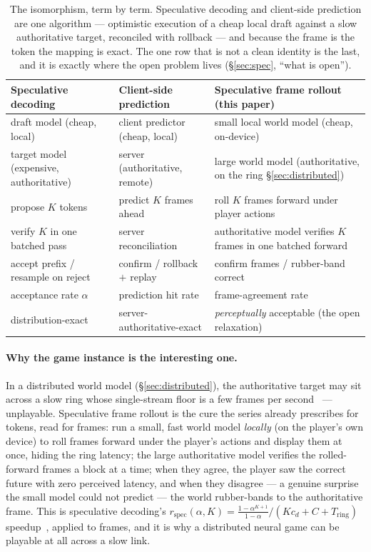 \documentclass[11pt]{article}
\newcommand{\Tring}{\ensuremath{T_{\mathrm{ring}}}}
\begin{document}
\begin{table}[t]
\centering
\small
\setlength{\tabcolsep}{5pt}
\begin{tabular}{@{}p{3.7cm}p{3.7cm}p{4.9cm}@{}}
\toprule
\textbf{Speculative decoding}~\cite{leviathan} & \textbf{Client-side prediction}~\cite{bernier} & \textbf{Speculative frame rollout (this paper)} \\
\midrule
draft model (cheap, local) & client predictor (cheap, local) & small local world model (cheap, on-device) \\
target model (expensive, authoritative) & server (authoritative, remote) & large world model (authoritative, on the ring \S\ref{sec:distributed}) \\
propose $K$ tokens & predict $K$ frames ahead & roll $K$ frames forward under player actions \\
verify $K$ in one batched pass & server reconciliation & authoritative model verifies $K$ frames in one batched forward \\
accept prefix / resample on reject & confirm / rollback $+$ replay & confirm frames / rubber-band correct \\
acceptance rate $\alpha$ & prediction hit rate & frame-agreement rate \\
distribution-exact & server-authoritative-exact & \emph{perceptually} acceptable (the open relaxation) \\
\bottomrule
\end{tabular}
\caption{The isomorphism, term by term. Speculative decoding and client-side prediction are one algorithm ---
optimistic execution of a cheap local draft against a slow authoritative target, reconciled with rollback ---
and because the frame is the token the mapping is exact. The one row that is not a clean identity is the last,
and it is exactly where the open problem lives (\S\ref{sec:spec}, ``what is open'').}
\label{tab:iso}
\end{table}

\paragraph{Why the game instance is the interesting one.} In a distributed world model
(\S\ref{sec:distributed}), the authoritative target may sit across a slow ring whose single-stream floor is a
few frames per second~\cite{latency} --- unplayable. Speculative frame rollout is the cure the series already
prescribes for tokens, read for frames: run a small, fast world model \emph{locally} (on the player's own
device) to roll frames forward under the player's actions and display them at once, hiding the ring latency;
the large authoritative model verifies the rolled-forward frames a block at a time; when they agree, the player
saw the correct future with zero perceived latency, and when they disagree --- a genuine surprise the small
model could not predict --- the world rubber-bands to the authoritative frame. This is speculative decoding's
$r_{\mathrm{spec}}(\alpha,K)=\frac{1-\alpha^{K+1}}{1-\alpha}/(K c_d + C + \Tring)$ speedup~\cite{latency,leviathan},
applied to frames, and it is why a distributed neural game can be playable at all across a slow link.
\end{document}
